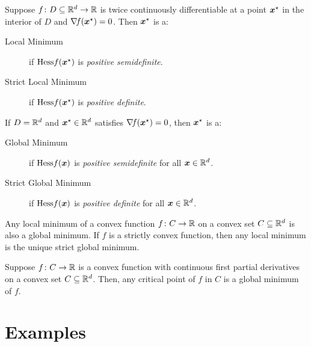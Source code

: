 \begin{theorem}\label{theorem:sufficientMinima}
Suppose $f\colon D \subseteq \mathbb{R}^d \to \mathbb{R}$ is twice continuously differentiable at a point $\boldsymbol{x}^{\star}$ in the interior of $D$ and $\mathop{\nabla\! {f}}(\boldsymbol{x}^{\star})=0$.  Then $\boldsymbol{x}^{\star}$ is a:
\begin{description}
	\item[Local Minimum] if $\mathop{\mathrm{Hess}{f}}(\boldsymbol{x}^{\star})$ is \emph{positive semidefinite}.
	\item[Strict Local Minimum] if $\mathop{\mathrm{Hess}{f}}(\boldsymbol{x}^{\star})$ is \emph{positive definite}.
\end{description}
If $D=\mathbb{R}^d$ and $\boldsymbol{x}^{\star} \in \mathbb{R}^d$ satisfies $\mathop{\nabla\! {f}}(\boldsymbol{x}^{\star})=0$, then $\boldsymbol{x}^{\star}$ is a:
\begin{description}
	\item[Global Minimum] if $\mathop{\mathrm{Hess}{f}}(\boldsymbol{x})$ is \emph{positive semidefinite} for all $\boldsymbol{x} \in \mathbb{R}^d$.
	\item[Strict Global Minimum] if $\mathop{\mathrm{Hess}{f}}(\boldsymbol{x})$ is \emph{positive definite} for all $\boldsymbol{x} \in \mathbb{R}^d$.
\end{description}
\end{theorem}

\begin{theorem}\label{theorem:ConvexMinima}
Any local minimum of a convex function $f\colon C \to \mathbb{R}$ on a convex set $C \subseteq \mathbb{R}^d$ is also a global minimum.  If $f$ is a strictly convex function, then any local minimum is the unique strict global minimum.
\end{theorem}

\begin{theorem}\label{theorem:ConvexCritical}
Suppose $f\colon C \to \mathbb{R}$ is a convex function with continuous first partial derivatives on a convex set $C \subseteq \mathbb{R}^d$.  Then, any critical point of $f$ in $C$ is a global minimum of $f$.
\end{theorem}

\section*{Examples}

